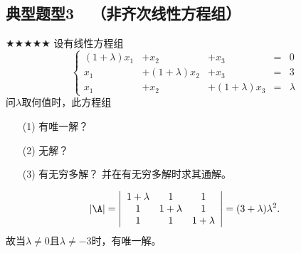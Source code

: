 \subsection{典型题型3~~（非齐次线性方程组）}

\begin{frame}\ft{\subsecname}
  \begin{scriptsize}
    \begin{exampleblock}{$\bigstar\bigstar\bigstar\bigstar\bigstar$}
      设有线性方程组
      $$
      \left\{
      \begin{array}{rrrcr}
        (1+\lambda)x_1&+x_2&+x_3&=&0\\[0.05in]
        x_1&+(1+\lambda)x_2&+x_3&=&3\\[0.05in]
        x_1&+x_2&+(1+\lambda)x_3&=&\lambda
      \end{array}
      \right.
      $$
      问$\lambda$取何值时，此方程组
      \begin{itemize}
      \item[(1)]有唯一解？
      \item[(2)]无解？ 
      \item[(3)]有无穷多解？ 并在有无穷多解时求其通解。
      \end{itemize}
    \end{exampleblock}
    \pause\jiename
    $$
    |\A|=\left|
    \begin{array}{ccc}
      1+\lambda&1&1\\
      1&1+\lambda&1\\
      1&1&1+\lambda
    \end{array}
    \right| = (3+\lambda)\lambda^2.
    $$
    故当$\lambda\ne0$且$\lambda\ne-3$时，有唯一解。
  \end{scriptsize}
\end{frame}



